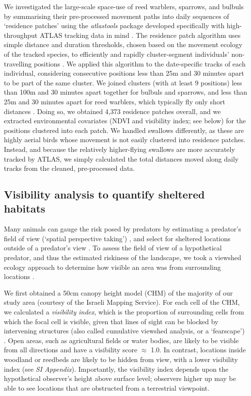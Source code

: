 \begin{refsection}
We investigated the large-scale space-use of reed warblers, sparrows, and bulbuls by summarising their pre-processed movement paths into daily sequences of `residence patches' using the \textit{atlastools} package developed specifically with high-throughput ATLAS tracking data in mind \citep{gupte2022d}.
The residence patch algorithm uses simple distance and duration thresholds, chosen based on the movement ecology of the tracked species, to efficiently and rapidly cluster-segment individuals' non-travelling positions \citep{gupte2022d}.
We applied this algorithm to the date-specific tracks of each individual, considering consecutive positions less than 25m and 30 minutes apart to be part of the same cluster.
We joined clusters (with at least 9 positions) less than 100m and 30 minutes apart together for bulbuls and sparrows, and less than 25m and 30 minutes apart for reed warblers, which typically fly only short distances \cite{kiat2016}.
Doing so, we obtained 4,373 residence patches overall, and we extracted environmental covariates (NDVI and visibility index; see below) for the positions clustered into each patch.
We handled swallows differently, as these are highly aerial birds whose movement is not easily clustered into residence patches.
Instead, and because the relatively higher-flying swallows are more accurately tracked by ATLAS, we simply calculated the total distances moved along daily tracks from the cleaned, pre-processed data.

\subsection*{Visibility analysis to quantify sheltered habitats}

Many animals can gauge the risk posed by predators by estimating a predator's field of view (`spatial perspective taking') \cite{emery2000,bruce2003,davidson2016}, and select for sheltered locations outside of a predator's view \citep{hampton1994,krams2001,watve2002}.
To assess the field of view of a hypothetical predator, and thus the estimated riskiness of the landscape, we took a viewshed ecology approach to determine how visible an area was from surrounding locations \citep{aben2018,aben2021}.

We first obtained a 50cm canopy height model (CHM) \citep{aben2021} of the majority of our study area (courtesy of the Israeli Mapping Service).
For each cell of the CHM, we calculated a \textit{visibility index}, which is the proportion of surrounding cells from which the focal cell is visible, given that lines of sight can be blocked by intervening structures (also called cumulative viewshed analysis, or a `fearscape') \cite{olsoy2015}.
Open areas, such as agricultural fields or water bodies, are likely to be visible from all directions and have a visibility score $\approx$ 1.0.
In contrast, locations inside woodland or reedbeds are likely to be hidden from view, with a lower visibility index (see \textit{SI Appendix}).
Importantly, the visibility index depends upon the hypothetical observer's height above surface level; observers higher up may be able to see locations that are obstructed from a terrestrial viewpoint.


\end{refsection}
